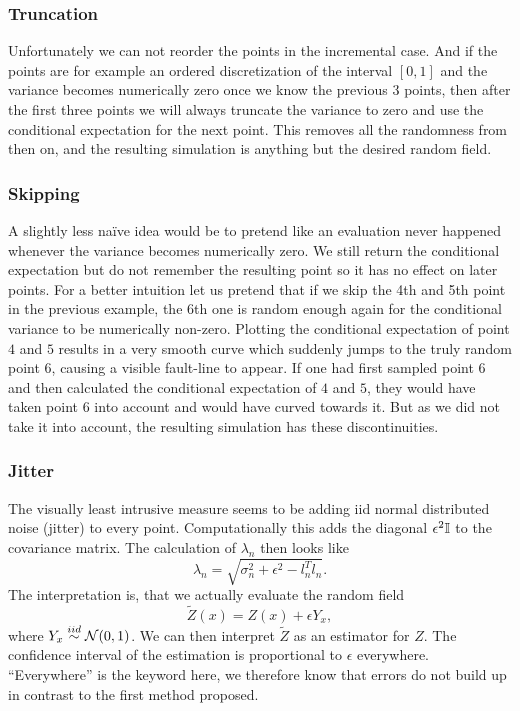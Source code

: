 \subsubsection{Truncation}

Unfortunately we can not reorder the points in the incremental case. And if the
points are for example an ordered discretization of the interval \([0,1]\) and
the variance becomes numerically zero once we know the previous \(3\) points,
then after the first three points we will always truncate the variance to zero
and use the conditional expectation for the next point. This removes all the
randomness from then on, and the resulting simulation is anything but the desired
random field.

\subsubsection{Skipping}

A slightly less naïve idea would be to pretend like an evaluation never happened
whenever the variance becomes numerically zero. We still return the conditional
expectation but do not remember the resulting point so it has no effect on later
points. For a better intuition let us pretend that if we skip the 4th and 5th point
in the previous example, the 6th one is random enough again for the conditional
variance to be numerically non-zero. Plotting the conditional expectation of
point \(4\) and \(5\) results in a very smooth curve which suddenly jumps
to the truly random point \(6\), causing a visible fault-line to appear. If one
had first sampled point \(6\) and then calculated the conditional expectation
of \(4\) and \(5\), they would have taken point \(6\) into account and would
have curved towards it. But as we did not take it into account, the resulting
simulation has these discontinuities.

\subsubsection{Jitter}

The visually least intrusive measure seems to be adding iid normal distributed
noise (jitter) to every point. Computationally this adds the diagonal \(\epsilon^2
\mathbb{I}\) to the covariance matrix. The calculation of \(\lambda_n\) then
looks like
\[
	\lambda_n = \sqrt{\sigma_n^2 + \epsilon^2 - l_n^T l_n}.
\]
The interpretation is, that we actually evaluate the random field
\[
	\tilde{Z}(x) = Z(x) + \epsilon Y_x,
\]
where \(Y_x\overset{iid}\sim\mathcal{N}(0,1)\). We can then interpret \(\tilde{Z}\)
as an estimator for \(Z\). The confidence interval of the estimation is
proportional to \(\epsilon\) everywhere. ``Everywhere'' is the keyword here, we
therefore know that errors do not build up in contrast to the first method
proposed.

